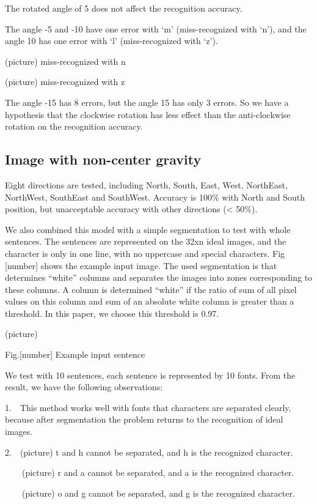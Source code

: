\documentclass[10pt,twocolumn,letterpaper]{article}
\begin{document}
\textbullet The rotated angle of 5 does not affect the recognition accuracy.

\textbullet The angle -5 and -10 have one error with ‘m’ (miss-recognized with ‘n’), and the angle 10 has one error with ‘l’ (miss-recognized with ‘z’).

(picture) miss-recognized with n

(picture) miss-recognized with z

\textbullet The angle -15 has 8 errors, but the angle 15 has only 3 errors. So we have a hypothesis that the clockwise rotation has less effect than the anti-clockwise rotation on the recognition accuracy.

\subsection{Image with non-center gravity}

Eight directions are tested, including North, South, East, West, NorthEast, NorthWest, SouthEast and SouthWest. Accuracy is 100\% with North and South position, but unacceptable accuracy with other directions (< 50\%).

We also combined this model with a simple segmentation to test with whole sentences. The sentences are represented on the 32xn ideal images, and the character is only in one line, with no uppercase and special characters. Fig [number] shows the example input image. The used segmentation is that determines “white” columns and separates the images into zones corresponding to these columns. A column is determined “white” if the ratio of sum of all pixel values on this column and sum of an absolute white column is greater than a threshold. In this paper, we choose this threshold is 0.97.

(picture)

Fig.[number] Example input sentence

We test with 10 sentences, each sentence is represented by 10 fonts. From the result, we have the following observations:

1.~~This method works well with fonts that characters are separated clearly, because after segmentation the problem returns to the recognition of ideal images. 

2.~~(picture) t and h cannot be separated, and h is the recognized character.

~~~~(picture) r and a cannot be separated, and a is the recognized character.

~~~~(picture) o and g cannot be separated, and g is the recognized character.
\end{document}
